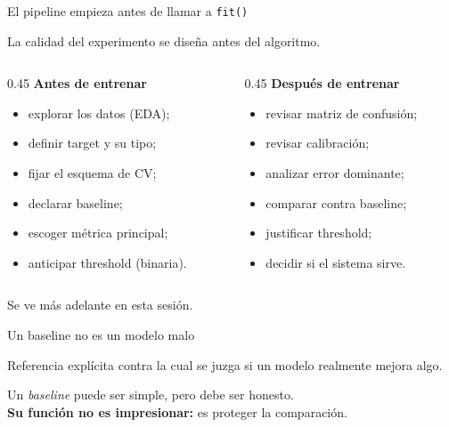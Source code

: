 \documentclass[aspectratio=169,12pt]{beamer}
\newcommand{\colhead}[1]{\textbf{#1}\par\vspace{2pt}}
\begin{document}
\begin{frame}{El pipeline empieza antes de llamar a \texttt{fit()}}
  \begin{center}
    \large La calidad del experimento se diseña antes del algoritmo.
  \end{center}
  \begin{columns}[T]
    \begin{column}{0.45\textwidth}
      \colhead{Antes de entrenar}
      \begin{itemize}
        \item explorar los datos (EDA);
        \item definir target y su tipo;
        \item fijar el esquema de CV\gold{*};
        \item declarar baseline\gold{*};
        \item escoger métrica principal;
        \item anticipar threshold (binaria).
      \end{itemize}
    \end{column}
    \begin{column}{0.45\textwidth}
      \colhead{Después de entrenar}
      \begin{itemize}
        \item revisar matriz de confusión;
        \item revisar calibración\gold{*};
        \item analizar error dominante;
        \item comparar contra baseline\gold{*};
        \item justificar threshold;
        \item decidir si el sistema sirve.
      \end{itemize}
    \end{column}
  \end{columns}
  \vspace{4pt}
  {\footnotesize\color{mlgray}\gold{*} Se ve más adelante en esta sesión.}
\end{frame}

\begin{frame}{Un baseline no es un modelo malo}
  \large
  \begin{defbox}
    Referencia explícita contra la cual se juzga si un modelo realmente mejora algo.
  \end{defbox}
  \vspace{12pt}
  \begin{center}
    Un \emph{baseline} puede ser simple, pero debe ser honesto.\\[4pt]
    \textbf{Su función no es impresionar:} es proteger la comparación.
  \end{center}
\end{frame}
\end{document}
